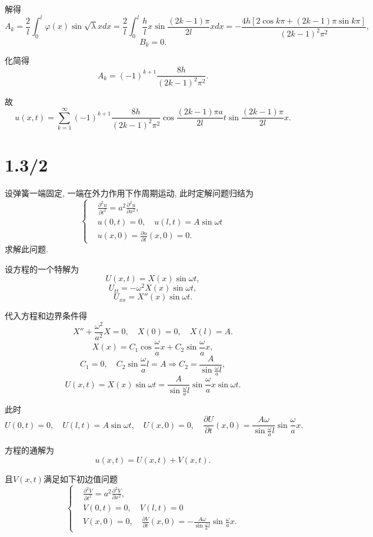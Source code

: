 \documentclass[11pt,a4paper]{article}
\begin{document}
解得
$$A_k=\frac{2}{l}\int_0^l\varphi(x)\sin\sqrt{\lambda}xdx=\frac{2}{l}\int_0^l\frac{h}{l}x\sin\frac{(2k-1)\pi}{2l}xdx=-\frac{4h[2\cos k\pi+(2k-1)\pi\sin k\pi]}{(2k-1)^2\pi^2},$$
$$B_k=0.$$

化简得
$$A_k=(-1)^{k+1}\frac{8h}{(2k-1)^2\pi^2}.$$

故
$$u(x,t)=\sum_{k=1}^\infty (-1)^{k+1}\frac{8h}{(2k-1)^2\pi^2}\cos\frac{(2k-1)\pi a}{2l}t\sin\frac{(2k-1)\pi}{2l}x.$$

\section{1.3/2}
\begin{problem}
设弹簧一端固定, 一端在外力作用下作周期运动, 此时定解问题归结为
$$
  \left\{\begin{aligned}
     & \frac{\partial^2u}{\partial t^2}=a^2\frac{\partial^2u}{\partial x^2}, \\
     & u(0,t)=0,\quad u(l,t)=A\sin\omega t                                   \\
     & u(x,0)=\frac{\partial u}{\partial t}(x,0)=0.
  \end{aligned}\right.
$$
求解此问题.
\end{problem}



设方程的一个特解为
$$U(x,t)=X(x)\sin\omega t,$$
$$U_{tt}=-\omega^2X(x)\sin\omega t,$$
$$U_{xx}=X''(x)\sin\omega t.$$

代入方程和边界条件得
$$X''+\frac{\omega^2}{a^2}X=0,\quad X(0)=0,\quad X(l)=A.$$
$$X(x)=C_1\cos\frac{\omega}{a}x+C_2\sin\frac{\omega}{a}x,$$
$$C_1=0,\quad C_2\sin\frac{\omega}{a}l=A\Longrightarrow
  C_2=\frac{A}{\sin\frac{\omega}{a}l},$$
$$U(x,t)=X(x)\sin\omega t=\frac{A}{\sin\frac{\omega}{a}l}\sin\frac{\omega}{a}x\sin\omega t.$$

此时
$$U(0,t)=0,\quad U(l,t)=A\sin\omega t,\quad U(x,0)=0,\quad \frac{\partial U}{\partial t}(x,0)=\frac{A\omega}{\sin\frac{\omega}{a}l}\sin\frac{\omega}{a}x.$$

方程的通解为
$$u(x,t)=U(x,t)+V(x,t).$$

且$V(x,t)$满足如下初边值问题
$$
  \left\{\begin{aligned}
     & \frac{\partial^2V}{\partial t^2}=a^2\frac{\partial^2V}{\partial x^2}, \\
     & V(0,t)=0,\quad V(l,t)=0                                               \\
     & V(x,0)=0,\quad \frac{\partial V}{\partial t}(x,0)
    =-\frac{A\omega}{\sin\frac{\omega}{a}l}\sin\frac{\omega}{a}x.
  \end{aligned}\right.
$$
\end{document}
